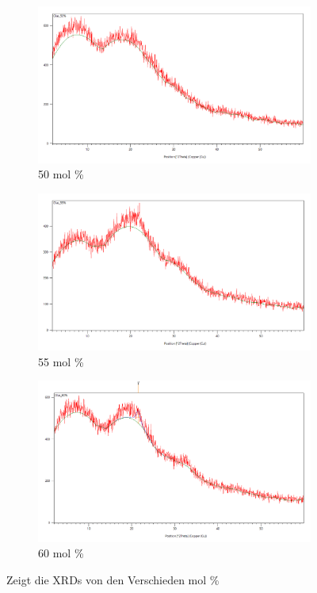 \documentclass[12pt, a4paper]{article}
\begin{document}
\begin{figure}[h]
\begin{subfigure}[b]{0.3\textwidth}
  \centering
  \includegraphics[width=\linewidth]{50pro.png}
  \caption{50 mol \% }
  \label{fig:sub5}
\end{subfigure}
\hfill
\begin{subfigure}[b]{0.3\textwidth}
  \centering
  \includegraphics[width=\linewidth]{55pro.png}
  \caption{55 mol \% }
  \label{fig:sub6}
\end{subfigure}
\hfill
\begin{subfigure}[b]{0.3\textwidth}
  \centering
  \includegraphics[width=\linewidth]{60pro.png}
  \caption{60 mol \% }
  \label{fig:sub7}
\end{subfigure}

\caption{Zeigt die XRDs von den Verschieden  mol \%}
\label{fig:sieben_bilder}
\end{figure}
\end{document}
